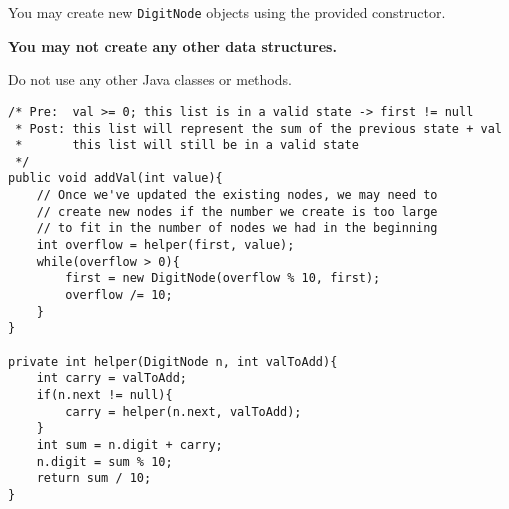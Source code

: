 \documentclass[12pt,letter]{article}
\begin{document}
\noindent You may create new \texttt{DigitNode} objects using the provided constructor.

\noindent \textbf{You may not create any other data structures.}

\noindent Do not use any other Java classes or methods.

\clearpage
\begin{verbatim}
/* Pre:  val >= 0; this list is in a valid state -> first != null
 * Post: this list will represent the sum of the previous state + val
 *       this list will still be in a valid state
 */
public void addVal(int value){
    // Once we've updated the existing nodes, we may need to 
    // create new nodes if the number we create is too large 
    // to fit in the number of nodes we had in the beginning
    int overflow = helper(first, value);
    while(overflow > 0){
        first = new DigitNode(overflow % 10, first);
        overflow /= 10;
    }
}   

private int helper(DigitNode n, int valToAdd){
    int carry = valToAdd;
    if(n.next != null){
        carry = helper(n.next, valToAdd);
    }
    int sum = n.digit + carry;
    n.digit = sum % 10;
    return sum / 10;
}
\end{verbatim}
\end{document}

